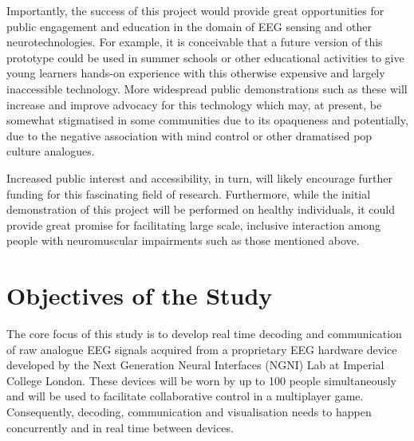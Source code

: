 Importantly, the success of this project would provide great opportunities for public engagement and education in the domain of EEG sensing and other neurotechnologies. For example, it is conceivable that a future version of this prototype could be used in summer schools or other educational activities to give young learners hands-on experience with this otherwise expensive and largely inaccessible technology. More widespread public demonstrations such as these will increase and improve advocacy for this technology which may, at present, be somewhat stigmatised in some communities due to its opaqueness and potentially, due to the negative association with mind control or other dramatised pop culture analogues.

Increased public interest and accessibility, in turn, will likely encourage further funding for this fascinating field of research. Furthermore, while the initial demonstration of this project will be performed on healthy individuals, it could provide great promise for facilitating large scale, inclusive interaction among people with neuromuscular impairments such as those mentioned above.  

\section{Objectives of the Study}
The core focus of this study is to develop real time decoding and communication of raw analogue EEG signals acquired from a proprietary EEG hardware device developed by the Next Generation Neural Interfaces (NGNI) Lab at Imperial College London. These devices will be worn by up to 100 people simultaneously and will be used to facilitate collaborative control in a multiplayer game. Consequently, decoding, communication and visualisation needs to happen concurrently and in real time between devices. 


